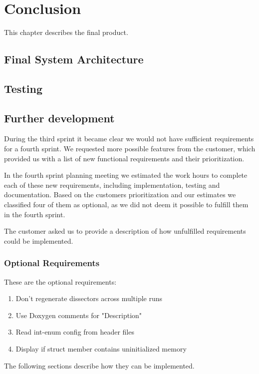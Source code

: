 \chapter{Conclusion}
This chapter describes the final product. 

\section{Final System Architecture}

\section{Testing}

\section{Further development}
\label{sec:eval:furtherdev}
During the third sprint it became clear we would not have sufficient requirements for a fourth sprint. We requested more possible features from the customer, which provided us with a list of new functional requirements and their prioritization.

In the fourth sprint planning meeting we estimated the work hours to complete each of these new requirements, including implementation, testing and documentation. Based on the customers prioritization and our estimates we classified four of them as optional, as we did not deem it possible to fulfill them in the fourth sprint. 

The customer asked us to provide a description of how unfulfilled requirements could be implemented.

\subsection{Optional Requirements}
These are the optional requirements:
\begin{enumerate}
\item Don't regenerate dissectors across multiple runs
\item Use Doxygen comments for "Description"	
\item Read int-enum config from header files
\item Display if struct member contains uninitialized memory
\end {enumerate}
The following sections describe how they can be implemented.

